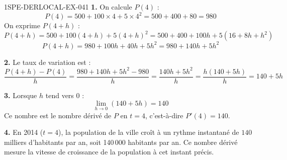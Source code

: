 \begin{corrige}{1SPE-DERLOCAL-EX-041}
\textbf{1.} On calcule $P(4)$ :
\[
P(4) = 500 + 100 \times 4 + 5 \times 4^2 = 500 + 400 + 80 = 980
\]
On exprime $P(4+h)$ :
\[
P(4+h) = 500 + 100(4+h) + 5(4+h)^2 = 500 + 400 + 100h + 5(16 + 8h + h^2)
\]
\[
P(4+h) = 980 + 100h + 40h + 5h^2 = 980 + 140h + 5h^2
\]

\textbf{2.} Le taux de variation est :
\[
\frac{P(4+h) - P(4)}{h} = \frac{980 + 140h + 5h^2 - 980}{h} = \frac{140h + 5h^2}{h} = \frac{h(140 + 5h)}{h} = 140 + 5h
\]

\textbf{3.} Lorsque $h$ tend vers $0$ :
\[
\lim_{h \to 0} (140 + 5h) = 140
\]
Ce nombre est le nombre dérivé de $P$ en $t = 4$, c'est-à-dire $P'(4) = 140$.

\textbf{4.} En 2014 ($t = 4$), la population de la ville croît à un rythme instantané de $\boxed{140}$ milliers d'habitants par an, soit 140\,000 habitants par an. Ce nombre dérivé mesure la vitesse de croissance de la population à cet instant précis.
\end{corrige}
